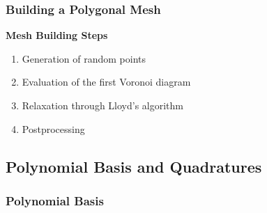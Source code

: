 \begin{frame} %
    \frametitle{Building a Polygonal Mesh}

    \vspace*{\fill}
    \begin{multicols}{2}
        
        \vspace*{\fill}
        \begin{center}
            {\color{\accentcolor} \Large \textbf{Mesh Building Steps}}
            \vspace*{0.5cm}

            \begin{minipage}{0.4\textwidth}
                \begin{enumerate}
                    \item Generation of random points
                    \item Evaluation of the first Voronoi diagram
                    \item Relaxation through Lloyd's algorithm
                    \item {\color{\accentcolor} Postprocessing}
                \end{enumerate}
            \end{minipage}
        \end{center}
        \vspace*{\fill}

        \vfill\null
        \columnbreak

        \vspace*{\fill}
        \begin{figure}[!ht]
            \centering
            
        \end{figure}
        \vspace*{\fill}

    \end{multicols}
    \vspace*{\fill}
    
\end{frame}

\subsection{Polynomial Basis and Quadratures}

\begin{frame}
    \frametitle{Polynomial Basis}

    
\end{frame}

